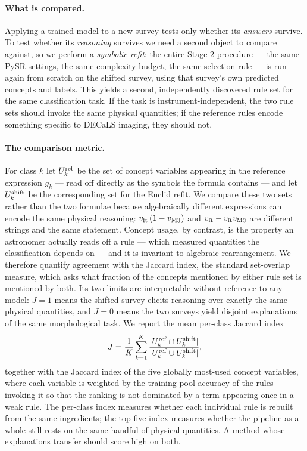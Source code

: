 \documentclass[11pt]{article}
\begin{document}
\paragraph{What is compared.}
Applying a trained model to a new survey tests only whether its \emph{answers}
survive. To test whether its \emph{reasoning} survives we need a second object
to compare against, so we perform a \emph{symbolic refit}: the entire Stage-2
procedure --- the same PySR settings, the same complexity budget, the same
selection rule --- is run again from scratch on the shifted survey,
using that survey's own predicted concepts and labels. This yields a second,
independently discovered rule set for the same classification task. If the
task is instrument-independent, the two rule sets should invoke the same
physical quantities; if the reference rules encode something specific to
DECaLS imaging, they should not.

\paragraph{The comparison metric.}
For class $k$ let $U_k^{\rm ref}$ be the set of concept variables appearing in
the reference expression $g_k$ --- read off directly as the symbols the
formula contains --- and let $U_k^{\rm shift}$ be the corresponding set for
the Euclid refit. We compare these two sets rather than the two formulae
because algebraically different expressions can encode the same physical
reasoning: $v_{\rm ft}\,(1-v_{\rm M3})$ and $v_{\rm ft} - v_{\rm ft}v_{\rm M3}$
are different strings and the same statement. Concept usage, by contrast, is
the property an astronomer actually reads off a rule --- which measured
quantities the classification depends on --- and it is invariant to algebraic
rearrangement. We therefore quantify agreement with the Jaccard index, the
standard set-overlap measure, which asks what fraction of the concepts
mentioned by either rule set is mentioned by both. Its two limits are
interpretable without reference to any model: $J=1$ means the shifted survey
elicits reasoning over exactly the same physical quantities, and $J=0$ means
the two surveys yield disjoint explanations of the same morphological task. We
report the mean per-class Jaccard index
\begin{equation}
J = \frac{1}{K}\sum_{k=1}^{K}
    \frac{|U_k^{\rm ref} \cap U_k^{\rm shift}|}
         {|U_k^{\rm ref} \cup U_k^{\rm shift}|},
\label{eq:jaccard}
\end{equation}
together with the Jaccard index of the five globally most-used concept
variables, where each variable is weighted by the training-pool accuracy of
the rules invoking it so that the ranking is not dominated by a term appearing
once in a weak rule. The per-class index measures whether each individual
rule is rebuilt from the same ingredients; the top-five index measures whether
the pipeline as a whole still rests on the same handful of physical
quantities. A method whose explanations transfer should score high on both.
\end{document}
